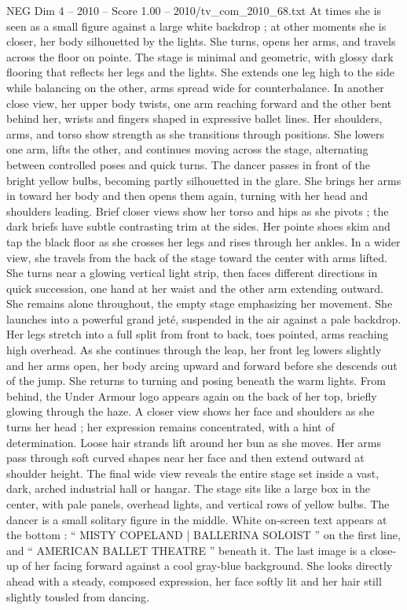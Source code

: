 \begin{textsample}{NEG Dim 4 – 2010 – Score 1.00 – 2010/tv\_com\_2010\_68.txt}
At times she is seen as a small figure against a large white backdrop ; at other moments she is closer, her body silhouetted by the lights.
She turns, opens her arms, and travels across the floor on pointe.
The stage is minimal and geometric, with glossy dark flooring that reflects her legs and the lights.
She extends one leg high to the side while balancing on the other, arms spread wide for counterbalance.
In another close view, her upper body twists, one arm reaching forward and the other bent behind her, wrists and fingers shaped in expressive ballet lines.
Her shoulders, arms, and torso show strength as she transitions through positions.
She lowers one arm, lifts the other, and continues moving across the stage, alternating between controlled poses and quick turns.
The dancer passes in front of the bright yellow bulbs, becoming partly silhouetted in the glare.
She brings her arms in toward her body and then opens them again, turning with her head and shoulders leading.
Brief closer views show her torso and hips as she pivots ; the dark briefs have subtle contrasting trim at the sides.
Her pointe shoes skim and tap the black floor as she crosses her legs and rises through her ankles.
In a wider view, she travels from the back of the stage toward the center with arms lifted.
She turns near a glowing vertical light strip, then faces different directions in quick succession, one hand at her waist and the other arm extending outward.
She remains alone throughout, the empty stage emphasizing her movement.
She launches into a powerful grand jeté, suspended in the air against a pale backdrop.
Her legs stretch into a full split from front to back, toes pointed, arms reaching high overhead.
As she continues through the leap, her front leg lowers slightly and her arms open, her body arcing upward and forward before she descends out of the jump.
She returns to turning and posing beneath the warm lights.
From behind, the Under Armour logo appears again on the back of her top, briefly glowing through the haze.
A closer view shows her face and shoulders as she turns her head ; her expression remains concentrated, with a hint of determination.
Loose hair strands lift around her bun as she moves.
Her arms pass through soft curved shapes near her face and then extend outward at shoulder height.
The final wide view reveals the entire stage set inside a vast, dark, arched industrial hall or hangar.
The stage sits like a large box in the center, with pale panels, overhead lights, and vertical rows of yellow bulbs.
The dancer is a small solitary figure in the middle.
White on-screen text appears at the bottom : “ MISTY COPELAND | BALLERINA SOLOIST ” on the first line, and “ AMERICAN BALLET THEATRE ” beneath it.
The last image is a close-up of her facing forward against a cool gray-blue background.
She looks directly ahead with a steady, composed expression, her face softly lit and her hair still slightly tousled from dancing.

\end{textsample}
